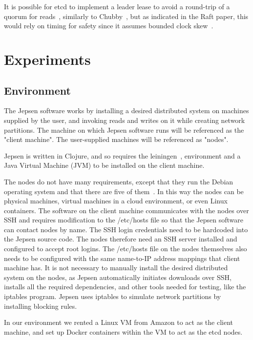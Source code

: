 \documentclass[12pt,conference]{IEEEtran}
\begin{document}
It is possible for etcd to implement a leader lease to avoid a round-trip of a quorum for reads~\cite{gray1989leases}, similarly to Chubby~\cite{burrows2006chubby}, but as indicated in the Raft paper, this would rely on timing for safety since it assumes bounded clock skew~\cite{ongaro2014search}.

\section{Experiments}
\subsection {Environment}

The Jepsen software works by installing a desired distributed system on machines supplied by the user, and invoking reads and writes on it while creating network partitions. The machine on which Jepsen software runs will be referenced as the "client machine". The user-supplied machines will be referenced as "nodes".

Jepsen is written in Clojure, and so requires the leiningen~\cite{leiningen}, environment and a Java Virtual Machine (JVM) to be installed on the client machine.

The nodes do not have many requirements, except that they run the Debian operating system and that there are five of them~\cite{jepsenGithubWebsite}. In this way the nodes can be physical machines, virtual machines in a cloud environment, or even Linux containers. The software on the client machine communicates with the nodes over SSH and requires modification to the /etc/hosts file so that the Jepsen software can contact nodes by name. The SSH login credentials need to be hardcoded into the Jepsen source code. The nodes therefore need an SSH server installed and configured to accept root logins. The /etc/hosts file on the nodes themselves also needs to be configured with the same name-to-IP address mappings that client machine has. It is not necessary to manually install the desired distributed system on the nodes, as Jepsen automatically initiates downloads over SSH, installs all the required dependencies, and other tools needed for testing, like the iptables program. Jepsen uses iptables to simulate network partitions by installing blocking rules.

In our environment we rented a Linux VM from Amazon to act as the client machine, and set up Docker containers within the VM to act as the etcd nodes.
\end{document}
